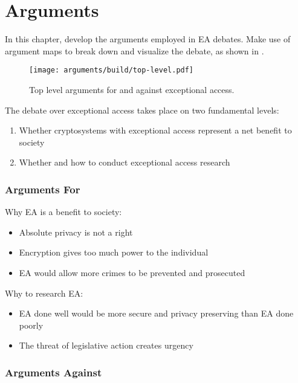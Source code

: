 \chapter{Arguments}
\label{chap-arguments}

In this chapter, develop the arguments employed in EA debates. Make use of argument maps to break down and visualize the
debate, as shown in .

\begin{figure}[h]
    \centering\CaptionFontSize
    \texttt{[image: arguments/build/top-level.pdf]}
    \caption[Argument: Top Level]{Top level arguments for and against exceptional access.}
    \label{fig-args-top-level}
\end{figure}

The debate over exceptional access takes place on two fundamental levels:
\begin{enumerate}
    \item Whether cryptosystems with exceptional access represent a net benefit to society
    \item Whether and how to conduct exceptional access research
\end{enumerate}

\subsection{Arguments For}

Why EA is a benefit to society:
\begin{itemize}
    \item Absolute privacy is not a right
    \item Encryption gives too much power to the individual
    \item EA would allow more crimes to be prevented and prosecuted
\end{itemize}

Why to research EA:
\begin{itemize}
    \item EA done well would be more secure and privacy preserving than EA done poorly
    \item The threat of legislative action creates urgency
\end{itemize}

\subsection{Arguments Against}

